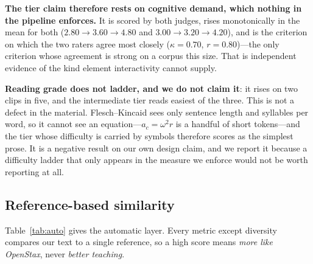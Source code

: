 \documentclass[conference]{IEEEtran}
\newcommand{\ac}{a_{c}}
\begin{document}
\textbf{The tier claim therefore rests on cognitive demand, which nothing in the
pipeline enforces.} It is scored by both judges, rises monotonically in the mean for both
($2.80 \rightarrow 3.60 \rightarrow 4.80$ and
$3.00 \rightarrow 3.20 \rightarrow 4.20$), and is the criterion on which the two
raters agree most closely ($\kappa = 0.70$, $r = 0.80$)---the only criterion
whose agreement is strong on a corpus this size. That is independent evidence of the kind element interactivity cannot
supply.

\textbf{Reading grade does not ladder, and we do not claim it}: it rises on two
clips in five, and the intermediate tier reads easiest of the three. This is
not a defect in the material. Flesch--Kincaid sees only sentence length and
syllables per word, so it cannot see an equation---$\ac = \omega^{2}r$ is a
handful of short tokens---and the tier whose difficulty is carried by symbols
therefore scores as the simplest prose. It is a negative result on our own
design claim, and we report it because a difficulty ladder that only appears in
the measure we enforce would not be worth reporting at all.

\subsection{Reference-based similarity}
\label{sec:results-auto}

Table~\ref{tab:auto} gives the automatic layer. Every metric except diversity
compares our text to a single reference, so a high score means \emph{more like
OpenStax}, never \emph{better teaching}.
\end{document}
